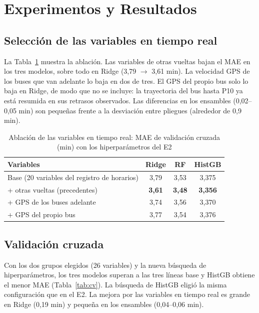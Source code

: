 \documentclass[conference,spanish]{IEEEtran}
\begin{document}
\section{Experimentos y Resultados}\label{sec:resultados}

\subsection{Selección de las variables en tiempo real}
La Tabla~\ref{tab:ablacion} muestra la ablación. Las variables de otras vueltas bajan el MAE en los tres modelos, sobre todo en Ridge (3,79 $\to$ 3,61 min). La velocidad GPS de los buses que van adelante lo baja en dos de tres. El GPS del propio bus solo lo baja en Ridge, de modo que no se incluye: la trayectoria del bus hasta P10 ya está resumida en sus retrasos observados. Las diferencias en los ensambles (0,02--0,05 min) son pequeñas frente a la desviación entre pliegues (alrededor de 0,9 min).

\begin{table}[h]
\centering
\caption{Ablación de las variables en tiempo real: MAE de validación cruzada (min) con los hiperparámetros del E2}
\label{tab:ablacion}
\footnotesize
\begin{tabular}{@{}lccc@{}}
\toprule
\textbf{Variables} & \textbf{Ridge} & \textbf{RF} & \textbf{HistGB}\\
\midrule
Base (20 variables del registro de horarios) & 3,79 & 3,53 & 3,375\\
+ otras vueltas (precedentes) & \textbf{3,61} & \textbf{3,48} & \textbf{3,356}\\
+ GPS de los buses adelante & 3,74 & 3,56 & 3,370\\
+ GPS del propio bus & 3,77 & 3,54 & 3,376\\
\bottomrule
\end{tabular}
\end{table}

\subsection{Validación cruzada}
Con los dos grupos elegidos (26 variables) y la nueva búsqueda de hiperparámetros, los tres modelos superan a las tres líneas base y HistGB obtiene el menor MAE (Tabla~\ref{tab:cv}). La búsqueda de HistGB eligió la misma configuración que en el E2. La mejora por las variables en tiempo real es grande en Ridge (0,19 min) y pequeña en los ensambles (0,04--0,06 min).
\end{document}
